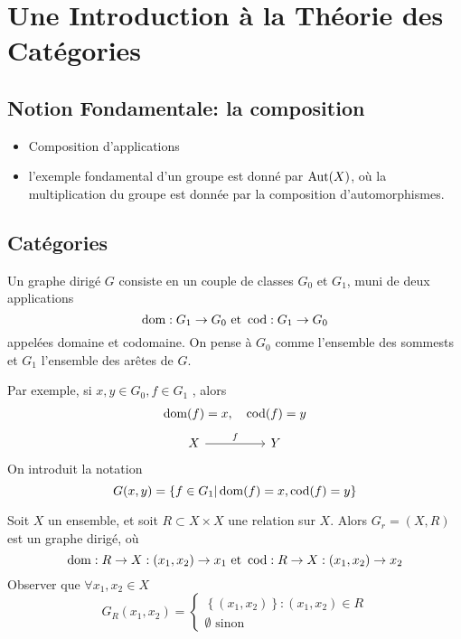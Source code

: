 \documentclass[../main.tex]{subfiles}
\begin{document}
\section{Une Introduction à la Théorie des Catégories}
\subsection*{Notion Fondamentale: la composition}
\begin{itemize}
\item Composition d'applications
\item l'exemple fondamental d'un groupe est donné par $\operatorname{Aut} ( X) $, où la multiplication du groupe est donnée par la composition d'automorphismes.
\end{itemize}
\subsection{Catégories}
\begin{defn}
	Un graphe dirigé $G$  consiste en un couple de classes $G_0$ et $G_1$, muni de deux applications
	\[ 
	\operatorname{dom} : G_1 \to G_0 \text{ et } \operatorname{cod} : G_1 \to G_0
	\]
	appelées domaine et codomaine.
	On pense à $G_0$ comme l'ensemble des sommests et $G_1$ l'ensemble des arêtes de $G$.
\end{defn}
Par exemple, si $x,y \in G_0, f \in G_1$ , alors 
\begin{align*}
	\operatorname{dom} ( f) =x,\quad \operatorname{cod} ( f) =y
\end{align*}
\[\begin{tikzcd}
	X && Y
	\arrow["f", from=1-1, to=1-3]
\end{tikzcd}\]
On introduit la notation
\[ 
	G( x,y) = \left\{ f \in G_1 | \operatorname{dom} ( f) = x , \operatorname{cod} ( f) =y \right\} 
\]
\begin{exemple}
	Soit $X$ un ensemble, et soit $R \subset X \times X$ une relation sur $X$. Alors $G_r=( X,R) $ est un graphe dirigé, où
	\[ 
		\operatorname{dom}: R \to X : ( x_1, x_2) \to x_1 \text{ et } \operatorname{cod}: R \to X: ( x_1, x_2) \to x_2
	\]
Observer que $\forall x_1, x_2 \in X$ 
\[ 
	G_R ( x_1, x_2) =
	\begin{cases}
		\left\{  ( x_1,x_2)  \right\}: ( x_1,x_2) \in R  \\
		\emptyset \text{ sinon } 
	\end{cases}
\]
\end{exemple}
\end{document}
